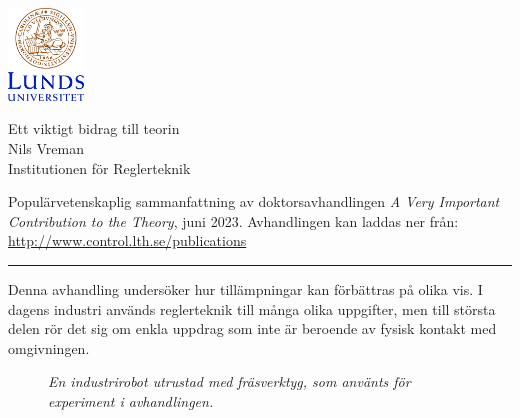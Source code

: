 \documentclass[svenska]{style/LTHthesis}
\begin{document}
\noindent\begin{minipage}[]{0.25\textwidth}
    \noindent\includegraphics[width=20mm]{style/LUCsv}
    \par\vspace*{3mm} 
\end{minipage}\hfill
\begin{minipage}[]{0.74\textwidth}
    \vspace*{-3mm}
    \sffamily
    \begin{flushleft}
        \huge Ett viktigt bidrag till teorin\\[2mm]
        \Large Nils Vreman\\[1mm]
        \normalsize Institutionen för Reglerteknik
    \end{flushleft}
\end{minipage}
\par\vspace{1mm}  
\begin{sffamily}\noindent Populärvetenskaplig sammanfattning av doktorsavhandlingen \emph{A Very Important Contribution to the Theory}, juni 2023. Avhandlingen kan laddas ner från: \url{http://www.control.lth.se/publications}

\end{sffamily}
\vspace{2mm}\hrule\vspace{3mm}
\noindent
Denna avhandling undersöker hur tillämpningar  kan förbättras på olika vis. I dagens industri används reglerteknik till många olika uppgifter, men till största delen rör det sig om enkla uppdrag som inte är beroende av fysisk kontakt med omgivningen.

\begin{figure}
    \vspace*{-2mm}
    \begin{centering}
        \fbox{\rule{0pt}{30mm}\rule{0.95\linewidth}{0pt}}
    \end{centering}\small\par\medskip
    \noindent\emph{En industrirobot utrustad med fräsverktyg, som använts för experiment i avhandlingen.}
    \vspace*{-2mm}
\end{figure}
\end{document}
